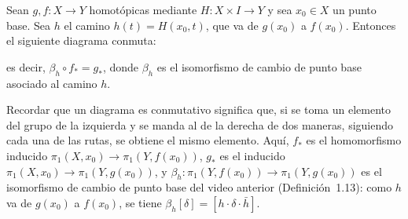 \documentclass[11pt]{article}
\begin{document}
\begin{lema}\label{lema:homotopia-cambio-base}
Sean $g,f\colon X\to Y$ homotópicas mediante $H\colon X\times I\to Y$ y sea $x_0\in X$ un punto base. Sea $h$ el camino $h(t)=H(x_0,t)$, que va de $g(x_0)$ a $f(x_0)$. Entonces el siguiente diagrama conmuta:
\begin{center}
\end{center}
es decir, $\beta_h\circ f_*=g_*$, donde $\beta_h$ es el isomorfismo de cambio de punto base asociado al camino $h$.
\end{lema}

Recordar que un diagrama es conmutativo significa que, si se toma un elemento del grupo de la izquierda y se manda al de la derecha de dos maneras, siguiendo cada una de las rutas, se obtiene el mismo elemento. Aquí, $f_*$ es el homomorfismo inducido $\pi_1(X,x_0)\to\pi_1(Y,f(x_0))$, $g_*$ es el inducido $\pi_1(X,x_0)\to\pi_1(Y,g(x_0))$, y $\beta_h\colon\pi_1(Y,f(x_0))\to\pi_1(Y,g(x_0))$ es el isomorfismo de cambio de punto base del video anterior (Definición~1.13): como $h$ va de $g(x_0)$ a $f(x_0)$, se tiene $\beta_h[\delta]=[h\cdot\delta\cdot\bar h]$.
\end{document}
